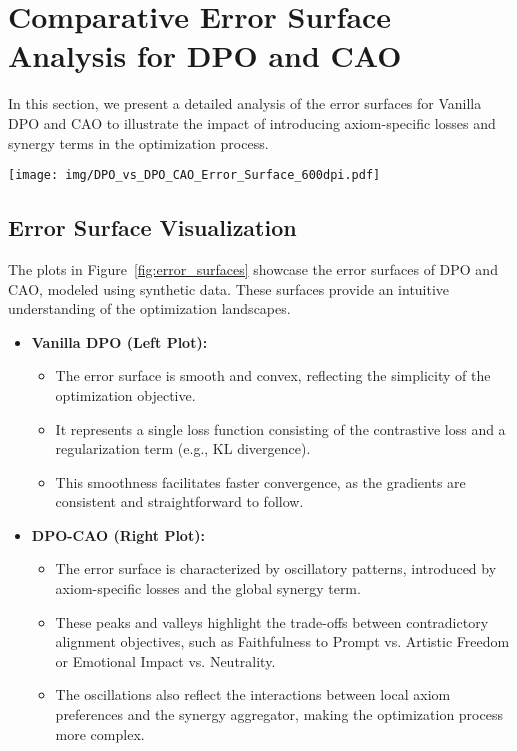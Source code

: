 \section{Comparative Error Surface Analysis for DPO and CAO}
\label{sec:appendix_error_surface_analysis}

In this section, we present a detailed analysis of the error surfaces for Vanilla DPO and CAO to illustrate the impact of introducing axiom-specific losses and synergy terms in the optimization process.


\begin{figure*}[ht!]
    \centering
    \texttt{[image: img/DPO\_vs\_DPO\_CAO\_Error\_Surface\_600dpi.pdf]}
    \caption{Error Surfaces for Vanilla DPO (Left) and CAO (Right). The smooth surface of DPO contrasts with the oscillatory patterns in CAO, reflecting the increased complexity due to multi-objective optimization.}
    \label{fig:error_surfaces}
\end{figure*}


\subsection{Error Surface Visualization}
The plots in Figure~\ref{fig:error_surfaces} showcase the error surfaces of DPO and CAO, modeled using synthetic data. These surfaces provide an intuitive understanding of the optimization landscapes.

\begin{itemize}
    \item \textbf{Vanilla DPO (Left Plot):}
    \begin{itemize}
        \item The error surface is smooth and convex, reflecting the simplicity of the optimization objective.
        \item It represents a single loss function consisting of the contrastive loss and a regularization term (e.g., KL divergence).
        \item This smoothness facilitates faster convergence, as the gradients are consistent and straightforward to follow.
    \end{itemize}

    \item \textbf{DPO-CAO (Right Plot):}
    \begin{itemize}
        \item The error surface is characterized by oscillatory patterns, introduced by axiom-specific losses and the global synergy term.
        \item These peaks and valleys highlight the trade-offs between contradictory alignment objectives, such as Faithfulness to Prompt vs. Artistic Freedom or Emotional Impact vs. Neutrality.
        \item The oscillations also reflect the interactions between local axiom preferences and the synergy aggregator, making the optimization process more complex.
    \end{itemize}
\end{itemize}

